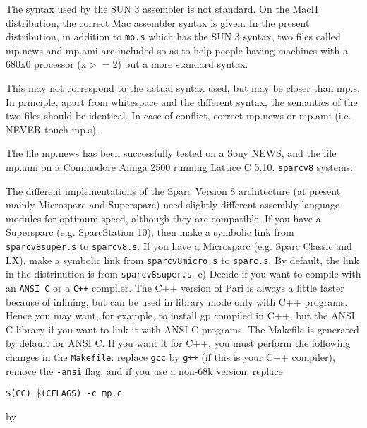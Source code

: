    The syntax used by the SUN 3 assembler is not standard. On the MacII 
   distribution, the correct Mac assembler syntax is given. In the present
   distribution, in addition to {\tt mp.s} which has the SUN 3 syntax, two 
   files called mp.news and mp.ami are included so as to help people having 
   machines with a 680x0 processor (x$>=2$) but a more standard syntax.

   This may not correspond to the actual syntax used, but may be closer than
   mp.s. In principle, apart from whitespace and the different syntax, the 
   semantics of the two files should be identical. In case of conflict, 
   correct mp.news or mp.ami (i.e. NEVER touch mp.s).

   The file mp.news has been successfully tested on a Sony NEWS, and the file
   mp.ami on a Commodore Amiga 2500 running Lattice C 5.10.
\smallskip
{\tt sparcv8} systems:

   The different implementations of the Sparc Version 8 architecture (at 
   present mainly Microsparc and Supersparc) need slightly different assembly
   language modules for optimum speed, although they are compatible.
   If you have a Supersparc (e.g. SparcStation 10), then make a symbolic
   link from {\tt sparcv8super.s} to {\tt sparcv8.s}. If you have a Microsparc
   (e.g. Sparc Classic and LX), make a symbolic link from {\tt sparcv8micro.s}
   to {\tt sparc.s}. By default, the link in the distrinution is from 
   {\tt sparcv8super.s}.
\medskip
   c) Decide if you want to compile with an {\tt ANSI C} or a {\tt C++}
      compiler. The C++ version of Pari is always a little faster
      because of inlining, but can be used in library mode only with C++ 
      programs. Hence you may want,
      for example, to install gp compiled in C++, but the ANSI C library if
      you want to link it with ANSI C programs.
      The Makefile is generated by default for ANSI C. If you want it for C++,
      you must perform the following changes in the {\tt Makefile}: replace
      {\tt gcc} by {\tt g++} (if this is your C++ compiler), remove the 
      {\tt -ansi} flag, and if you use a non-68k version, replace 

\centerline{\tt \$(CC) \$(CFLAGS) -c mp.c} 

by

